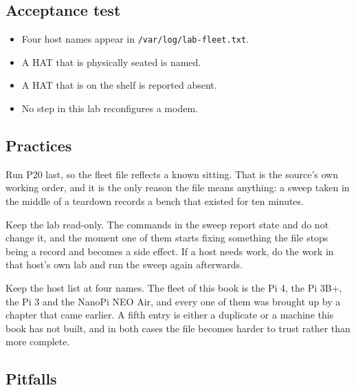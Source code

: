\subsection*{Acceptance test}

\begin{itemize}
\item Four host names appear in \texttt{/var/log/lab-fleet.txt}.
\item A HAT that is physically seated is named.
\item A HAT that is on the shelf is reported absent.
\item No step in this lab reconfigures a modem.
\end{itemize}

\subsection*{Practices}

Run P20 last, so the fleet file reflects a known sitting. That is the source's own working order, and it is the only reason the file means anything: a sweep taken in the middle of a teardown records a bench that existed for ten minutes.

Keep the lab read-only. The commands in the sweep report state and do not change it, and the moment one of them starts fixing something the file stops being a record and becomes a side effect. If a host needs work, do the work in that host's own lab and run the sweep again afterwards.

Keep the host list at four names. The fleet of this book is the Pi 4, the Pi 3B+, the Pi 3 and the NanoPi NEO Air, and every one of them was brought up by a chapter that came earlier. A fifth entry is either a duplicate or a machine this book has not built, and in both cases the file becomes harder to trust rather than more complete.

\subsection*{Pitfalls}

